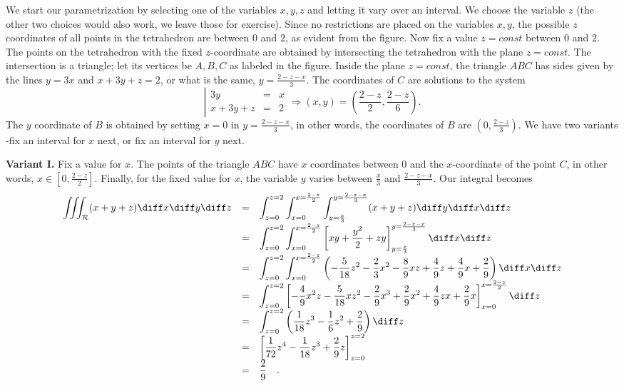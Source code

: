 {We start our parametrization by selecting one of the variables $x,y,z$ and letting it vary over an interval. We choose the variable $z$ (the other two choices would also work, we leave those for exercise). Since no restrictions are placed on the variables $x,y$, the possible $z$ coordinates of all points in the tetrahedron are between $0$ and $2$, as evident from the figure. Now fix a value $z=const$ between $0$ and $2$. The points on the tetrahedron with the fixed $z$-coordinate are obtained by intersecting the tetrahedron with the plane $z=const$. The intersection is a triangle; let its vertices be $A,B,C$ as labeled in the figure. %
Inside the plane $z=const$, the triangle $ABC$ has sides given by the lines $y=3x$ and $ x+3y+z=2$, or what is the same, $y=\frac{2-z-x}{3}$. The coordinates of $C$ are solutions to the system 
\[
\left|\begin{array}{rcl}
3y&=&x\\
x+3y+z&=&2
\end{array}
\right.
\Rightarrow (x,y)=\left(\frac{2-z}{2}, \frac{2-z}{6}\right).
\] 
The $y$ coordinate of $B$ is obtained by setting $x=0$ in $y=\frac{2-z-x}{3}$, in other words, the coordinates of $B$ are $\left(0, \frac{2-z}{3}\right)$. We have two variants -fix an interval for $x$ next, or fix an interval for $y$ next.

\noindent\textbf{ Variant I.} Fix a value for $x$. The points of the triangle $ABC$ have $x$ coordinates between $0$ and the $x$-coordinate of the point $C$, in other words, $x\in \left[0, \frac{2-z}{2}\right]$. Finally, for the fixed value for $x$, the variable $y$ varies between $\frac{x}{3}$ and $\frac{2-z-x}{3}$. Our integral becomes
\[
\begin{array}{rcl}
\displaystyle \iiint_{\mathcal R}(x+y+z)\diff x \diff y \diff z&=& \displaystyle \int_{z=0}^{z=2} \int_{x=0}^{ x=\frac{2-z}{2}} \int_{y=\frac{x}{3}}^{y=\frac{ 2-z-x}{3}} (x+y +z)\diff y \diff x \diff z  \\
&=&\displaystyle \int_{z=0}^{z=2} \int_{x=0}^{ x=\frac{2-z}{2}}  \left[x y+\frac{y^2}{2} +z y\right]_{y=\frac{x}{3}}^{y=\frac{2-z-x}{3}} \diff x \diff z\\
&=&\displaystyle \int_{z=0}^{z=2} \int_{x=0}^{ x=\frac{2-z}{2}}  \left(-\frac{5}{18} z^{2}-\frac{2}{3} x^{2}-\frac{8}{9} x z+\frac{4}{9} z+\frac{4}{9} x+\frac{2}{9} \right) \diff x \diff z\\
&=&\displaystyle \int_{z=0}^{z=2}\left[-\frac{4}{9} x^{2} z-\frac{5}{18} x z^{2}-\frac{2}{9} x^{3}+\frac{2}{9} x^{2}+\frac{4}{9} z x+\frac{2}{9} x 
\right]_{x=0}^{x=\frac{2-z}{2}}\diff z\\
&=&\displaystyle\int_{z=0}^{z=2}\left(\frac{1}{18} z^{3}-\frac{1}{6} z^{2}+\frac{2}{9}\right) \diff z\\
&=&\displaystyle \left[\frac{1}{72} z^{4}-\frac{1}{18} z^{3}+\frac{2}{9} z\right]_{z=0}^{z=2}\\
&=& \displaystyle\frac{2}{9}\quad .
\end{array}
\]
 
}
